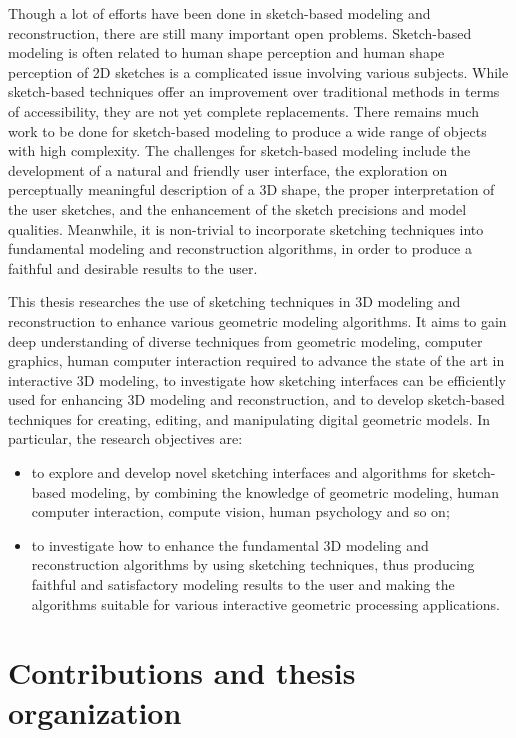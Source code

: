 Though a lot of efforts have  been done in sketch-based modeling and
reconstruction, there are still many important open problems.
Sketch-based modeling is often related to human shape perception and
human shape perception of 2D sketches is a complicated issue
involving various subjects. While sketch-based techniques offer an
improvement over traditional methods in terms of accessibility, they
are not yet complete replacements. There remains much work to be
done for sketch-based modeling  to produce a wide range of objects
with high complexity. The challenges for sketch-based modeling
include the development of a natural and friendly user interface,
the exploration on perceptually meaningful description of a 3D
shape, the proper interpretation of the user sketches, and the
enhancement of the sketch precisions and model qualities. Meanwhile,
it is non-trivial to incorporate sketching techniques into
fundamental modeling and reconstruction algorithms, in order to
produce a faithful and desirable results to the user.


This thesis researches the use  of sketching techniques in 3D
modeling and reconstruction to enhance various geometric modeling
algorithms. It aims to gain deep understanding of diverse techniques
from geometric modeling, computer graphics, human computer
interaction required to advance the state of the art in interactive
3D modeling, to investigate how sketching interfaces can be
efficiently used for enhancing 3D modeling and reconstruction, and
to develop sketch-based techniques for creating, editing, and
manipulating digital geometric models. In particular, the research
objectives are:
\begin{itemize}
\item to explore and develop novel sketching interfaces and
algorithms for sketch-based modeling, by combining the knowledge of
geometric modeling, human computer interaction, compute vision, human psychology and so on;

\item to investigate how to enhance the fundamental 3D modeling and reconstruction
algorithms by using sketching techniques, thus producing faithful
and satisfactory modeling results to the user and making the
algorithms suitable for various interactive geometric
 processing applications.
\end{itemize}


\section{Contributions and thesis organization}


